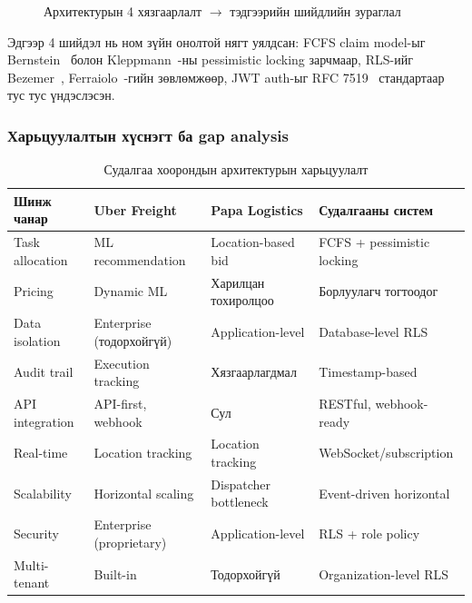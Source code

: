 \begin{figure}[H]
{
}
\caption{Архитектурын 4 хязгаарлалт $\to$ тэдгээрийн шийдлийн зураглал}
\label{fig:gap_solution_map}
\end{figure}

Эдгээр 4 шийдэл нь ном зүйн онолтой нягт уялдсан: FCFS claim model-ыг Bernstein~\cite{bernstein1987concurrency} болон Kleppmann~\cite{kleppmann2017ddia}-ны pessimistic locking зарчмаар, RLS-ийг Bezemer~\cite{bezemer2010multitenant}, Ferraiolo~\cite{ferraiolo1992rbac}-гийн зөвлөмжөөр, JWT auth-ыг RFC 7519~\cite{jones2015jwt} стандартаар тус тус үндэслэсэн.

\subsubsection{Харьцуулалтын хүснэгт ба gap analysis}

\begin{table}[h!]
\centering
\footnotesize
\caption{Судалгаа хоорондын архитектурын харьцуулалт}
\label{tab:comparative_analysis}
\begin{tabular}{|p{2.8cm}|p{3.3cm}|p{3.3cm}|p{3.5cm}|}
\hline
\textbf{Шинж чанар} & \textbf{Uber Freight} & \textbf{Papa Logistics} & \textbf{Судалгааны систем} \\
\hline
Task allocation & ML recommendation & Location-based bid & FCFS + pessimistic locking \\
\hline
Pricing & Dynamic ML & Харилцан тохиролцоо & Борлуулагч тогтоодог \\
\hline
Data isolation & Enterprise (тодорхойгүй) & Application-level & Database-level RLS \\
\hline
Audit trail & Execution tracking & Хязгаарлагдмал & Timestamp-based \\
\hline
API integration & API-first, webhook & Сул & RESTful, webhook-ready \\
\hline
Real-time & Location tracking & Location tracking & WebSocket/subscription \\
\hline
Scalability & Horizontal scaling & Dispatcher bottleneck & Event-driven horizontal \\
\hline
Security & Enterprise (proprietary) & Application-level & RLS + role policy \\
\hline
Multi-tenant & Built-in & Тодорхойгүй & Organization-level RLS \\
\hline
\end{tabular}
\end{table}

